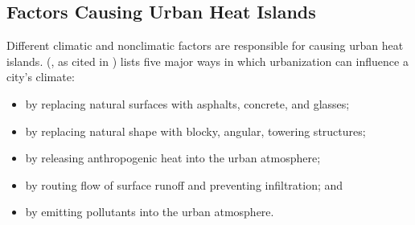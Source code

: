 	\subsection{Factors Causing Urban Heat Islands}
	
	Different climatic and nonclimatic factors are responsible for causing urban heat islands.
	\citeauthor{Bridgman1995} (\citeyear{Bridgman1995}, as cited in \cite{Khan2021}) lists five major ways in which urbanization can influence a city's climate:
	\begin{itemize}
		\item by replacing natural surfaces with asphalts, concrete, and glasses;
		\item by replacing natural shape with blocky, angular, towering structures;
		\item by releasing anthropogenic heat into the urban atmosphere;
		\item by routing flow of surface runoff and preventing infiltration; and
		\item by emitting pollutants into the urban atmosphere.
	\end{itemize}
